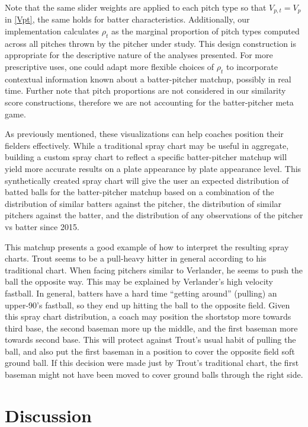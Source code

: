 \documentclass[12pt]{article}
\begin{document}
Note that the same slider weights are applied to each pitch type so that $V_{p,t} = V_p$ in \eqref{Vpt}, the same holds for batter characteristics. Additionally, our implementation calculates $\rho_t$ as the marginal proportion of pitch types computed across all pitches thrown by the pitcher under study. This design construction is appropriate for the descriptive nature of the analyses presented. For more prescriptive uses, one could adapt more flexible choices of $\rho_t$ to incorporate contextual information known about a batter-pitcher matchup, possibly in real time. Further note that pitch proportions are not considered in our similarity score constructions, therefore we are not accounting for the batter-pitcher meta game.


As previously mentioned, these visualizations can help coaches position their fielders effectively. While a traditional spray chart may be useful in aggregate, building a custom spray chart to reflect a specific batter-pitcher matchup will yield more accurate results on a plate appearance by plate appearance level. This synthetically created spray chart will give the user an expected distribution of batted balls for the batter-pitcher matchup based on a combination of the distribution of similar batters against the pitcher, the distribution of similar pitchers against the batter, and the distribution of any observations of the pitcher vs batter since 2015. 

This matchup presents a good example of how to interpret the resulting spray charts. Trout seems to be a pull-heavy hitter in general according to his traditional chart. When facing pitchers similar to Verlander, he seems to push the ball the opposite way. This may be explained by Verlander's high velocity fastball. In general, batters have a hard time ``getting around'' (pulling) an upper-90's fastball, so they end up hitting the ball to the opposite field. Given this spray chart distribution, a coach may position the shortstop more towards third base, the second baseman more up the middle, and the first baseman more towards second base. This will protect against Trout's usual habit of pulling the ball, and also put the first baseman in a position to cover the opposite field soft ground ball. If this decision were made just by Trout's traditional chart, the first baseman might not have been moved to cover ground balls through the right side.





\section{Discussion}
\end{document}
